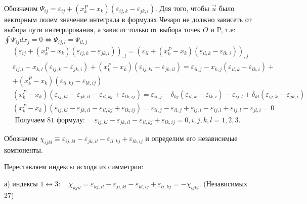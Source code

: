  Обозначим $\Psi_{i j}=\varepsilon_{i j}+\left(x_k^P-x_k\right)\left(\varepsilon_{i j, k}-\varepsilon_{j k, i}\right)$. Для того, чтобы $\vec{u}$ было векторным полем значение интеграла в формулах Чезаро не должно зависеть от выбора пути интегрирования, а зависит только от выбора точек $O$ и P, т.е: $\oint \Psi_{i j} d x_j=0 \Leftrightarrow \Psi_{i j, l}=\Psi_{i l,j}$
$$
\begin{aligned}
& \left(\varepsilon_{i j}+\left(x_k^P-x_k\right)\left(\varepsilon_{i j, k}-\varepsilon_{j k, i}\right)\right)_{, l}=\left(\varepsilon_{i l}+\left(x_k^P-x_k\right)\left(\varepsilon_{i l, k}-\varepsilon_{l k, i}\right)\right)_{, j} \\
& \varepsilon_{i j, l}-x_{k, l}\left(\varepsilon_{i j, k}-\varepsilon_{j k, i}\right)+\left(x_k^P-x_k\right)\left(\varepsilon_{i j, k l}-\varepsilon_{j k, i l}\right)=\varepsilon_{i l, j}-x_{k, j}\left(\varepsilon_{i l, k}-\varepsilon_{l k, i}\right)+ \\&+\left(x_k^P-x_k\right)\left(\varepsilon_{i l, k j}-\varepsilon_{l k, i j}\right) \\
& \left(x_k^P-x_k\right)\left(\varepsilon_{i j, k l}-\varepsilon_{j k, i l}-\varepsilon_{i l, k j}+\varepsilon_{l k, i j}\right)=\varepsilon_{i l, j}-\delta_{k j}\left(\varepsilon_{i l, k}-\varepsilon_{l k, i}\right)-\varepsilon_{i j, l}+\delta_{k l}\left(\varepsilon_{i j, k}-\varepsilon_{j k, i}\right) \\
& \left(x_k^P-x_k\right)\left(\varepsilon_{i j, k l}-\varepsilon_{j k, i l}-\varepsilon_{i l, k j}+\varepsilon_{l k, i j}\right)=\varepsilon_{i l, j}-\varepsilon_{i l, j}+\varepsilon_{l j, i}-\varepsilon_{i j, l}+\varepsilon_{i j, l}-\varepsilon_{j l, i}=0 \\
& \text { Получаем } 81 \text { формулу: } \quad \varepsilon_{i j, k l}-\varepsilon_{j k, i l}-\varepsilon_{i l, k j}+\varepsilon_{l k, i j}=0, i, j, k, l=1,2,3.
\end{aligned}
$$


Обозначим $\chi_{i j k l} \equiv \varepsilon_{i j, k l}-\varepsilon_{j k, i l}-\varepsilon_{i l, k j}+\varepsilon_{l k, i j}$ и определим его независимые компоненты. 

Переставляем индексы исходя из симметрии:


а) индексы $1 \leftrightarrow 3: \quad \chi_{k j i l}=\varepsilon_{k j, i l}-\varepsilon_{j i, k l}-\varepsilon_{k l, i j}+\varepsilon_{l i, k j}=-\chi_{i j k l}$. (Независимых 27)


